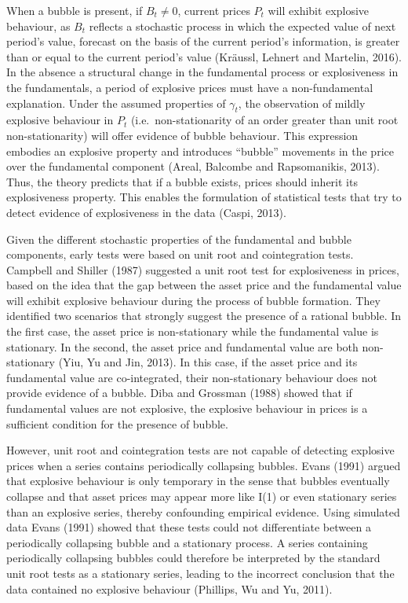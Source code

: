 \documentclass[12pt,]{article}
\begin{document}
When a bubble is present, if \(B_t \neq 0\), current prices \(P_t\) will
exhibit explosive behaviour, as \(B_t\) reflects a stochastic process in
which the expected value of next period's value, forecast on the basis
of the current period's information, is greater than or equal to the
current period's value (Kräussl, Lehnert and Martelin, 2016). In the
absence a structural change in the fundamental process or explosiveness
in the fundamentals, a period of explosive prices must have a
non-fundamental explanation. Under the assumed properties of
\(\gamma_t\), the observation of mildly explosive behaviour in \(P_t\)
(i.e.~non-stationarity of an order greater than unit root
non-stationarity) will offer evidence of bubble behaviour. This
expression embodies an explosive property and introduces ``bubble''
movements in the price over the fundamental component (Areal, Balcombe
and Rapsomanikis, 2013). Thus, the theory predicts that if a bubble
exists, prices should inherit its explosiveness property. This enables
the formulation of statistical tests that try to detect evidence of
explosiveness in the data (Caspi, 2013).

Given the different stochastic properties of the fundamental and bubble
components, early tests were based on unit root and cointegration tests.
Campbell and Shiller (1987) suggested a unit root test for explosiveness
in prices, based on the idea that the gap between the asset price and
the fundamental value will exhibit explosive behaviour during the
process of bubble formation. They identified two scenarios that strongly
suggest the presence of a rational bubble. In the first case, the asset
price is non-stationary while the fundamental value is stationary. In
the second, the asset price and fundamental value are both
non-stationary (Yiu, Yu and Jin, 2013). In this case, if the asset price
and its fundamental value are co-integrated, their non-stationary
behaviour does not provide evidence of a bubble. Diba and Grossman
(1988) showed that if fundamental values are not explosive, the
explosive behaviour in prices is a sufficient condition for the presence
of bubble.

However, unit root and cointegration tests are not capable of detecting
explosive prices when a series contains periodically collapsing bubbles.
Evans (1991) argued that explosive behaviour is only temporary in the
sense that bubbles eventually collapse and that asset prices may appear
more like I(1) or even stationary series than an explosive series,
thereby confounding empirical evidence. Using simulated data Evans
(1991) showed that these tests could not differentiate between a
periodically collapsing bubble and a stationary process. A series
containing periodically collapsing bubbles could therefore be
interpreted by the standard unit root tests as a stationary series,
leading to the incorrect conclusion that the data contained no explosive
behaviour (Phillips, Wu and Yu, 2011).
\end{document}
